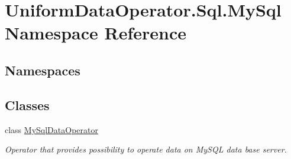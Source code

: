 \hypertarget{namespace_uniform_data_operator_1_1_sql_1_1_my_sql}{}\section{Uniform\+Data\+Operator.\+Sql.\+My\+Sql Namespace Reference}
\label{namespace_uniform_data_operator_1_1_sql_1_1_my_sql}
\subsection*{Namespaces}
\begin{DoxyCompactItemize}
\end{DoxyCompactItemize}
\subsection*{Classes}
\begin{DoxyCompactItemize}
\item 
class \mbox{\hyperlink{class_uniform_data_operator_1_1_sql_1_1_my_sql_1_1_my_sql_data_operator}{My\+Sql\+Data\+Operator}}
\begin{DoxyCompactList}\small\item\em Operator that provides possibility to operate data on My\+S\+QL data base server. \end{DoxyCompactList}\end{DoxyCompactItemize}
